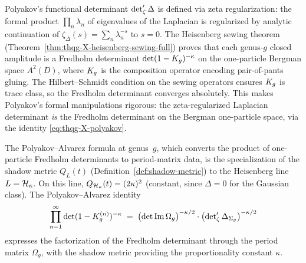 \begin{remark}%
\label{rem:functional-det-fredholm-bridge}%
%
Polyakov's functional determinant $\det\nolimits'_\zeta\Delta$ is defined via
zeta regularization: the formal product $\prod_n \lambda_n$ of
eigenvalues of the Laplacian is regularized by analytic continuation
of $\zeta_\Delta(s) = \sum_n \lambda_n^{-s}$ to $s = 0$.
The Heisenberg sewing theorem
(Theorem~\ref{thm:thqg-X-heisenberg-sewing-full})
proves that each genus-$g$ closed amplitude is a Fredholm determinant
$\det(1 - K_g)^{-\kappa}$ on the one-particle Bergman space
$A^2(D)$, where $K_g$ is the composition operator encoding
pair-of-pants gluing. The Hilbert--Schmidt condition on
the sewing operators ensures $K_g$ is trace class, so the
Fredholm determinant converges absolutely. This makes Polyakov's
formal manipulations rigorous: the zeta-regularized Laplacian
determinant \emph{is} the Fredholm determinant on the Bergman
one-particle space, via the identity
\eqref{eq:thqg-X-polyakov}.
\end{remark}

\begin{proposition}%
\label{prop:polyakov-alvarez-shadow-specialization}%
%
The Polyakov--Alvarez formula at genus~$g$, which converts the
product of one-particle Fredholm determinants to period-matrix
data, is the specialization of the shadow metric
$Q_L(t)$ \textup{(}Definition~\textup{\ref{def:shadow-metric}}\textup{)}
to the Heisenberg line $L = \mathcal{H}_\kappa$.
On this line, $Q_{\mathcal{H}_\kappa}(t) = (2\kappa)^2$ \textup{(}constant,
since $\Delta = 0$ for the Gaussian class\textup{)}.
The Polyakov--Alvarez identity
\begin{equation}\label{eq:thqg-X-polyakov-shadow}
\prod_{n=1}^{\infty}
\det(1 - K_g^{(n)})^{-\kappa}
\;=\;
\bigl(\det\operatorname{Im}\Omega_g\bigr)^{-\kappa/2}
\cdot
\bigl(\det\nolimits'_\zeta\Delta_{\Sigma_g}\bigr)^{-\kappa/2}
\end{equation}
expresses the factorization of the Fredholm determinant through
the period matrix $\Omega_g$, with the shadow metric providing the
proportionality constant $\kappa$.
\end{proposition}

